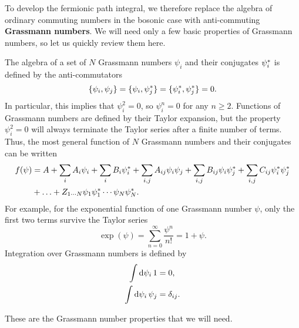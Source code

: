 To develop the fermionic path integral, we therefore replace the algebra of ordinary commuting numbers in the bosonic case with anti-commuting \textbf{Grassmann numbers}.
We will need only a few basic properties of Grassmann numbers, so let us quickly review them here.

The algebra of a set of $N$ Grassmann numbers $\psi_i$ and their conjugates ${\psi}^*_i$ is defined by the anti-commutators
\begin{equation}
	\{ \psi_i , \psi_j \} = 
	\{ \psi_i , {\psi}^*_j \} = 
	\{ {\psi}^*_i , {\psi}^*_j \} = 
	0 .
\label{eq:gnums:anticommutators}
\end{equation}
In particular, this implies that $\psi_i^2 = 0$, so $\psi_i^n = 0$ for any $n \geq 2$.
Functions of Grassmann numbers are defined by their Taylor expansion, but the property $\psi_i^2 = 0$ will always terminate the Taylor series after a finite number of terms.
Thus, the most general function of $N$ Grassmann numbers and their conjugates can be written
\begin{equation}
\begin{split}
	f(\psi) &= A + \sum_i A_i \psi_i + \sum_i B_i {\psi}^*_i + \sum_{i,j} A_{ij} \psi_i \psi_j + \sum_{i,j} B_{ij} \psi_i {\psi}^*_j + \sum_{i,j} C_{ij} {\psi}^*_i {\psi}^*_j \\
	        &+ \ldots + Z_{1 \cdots N} \psi_1 {\psi}^*_1 \cdots \psi_N {\psi}^*_N .
\end{split}
\label{eq:gnums:function_taylor_series}
\end{equation}
For example, for the exponential function of one Grassmann number $\psi$, only the first two terms survive the Taylor series
\begin{equation}
	\exp(\psi) = \sum_{n=0}^\infty \frac{\psi^n}{n!} = 1 + \psi .
\label{eq:gnums:exponential_taylor_series}
\end{equation}
Integration over Grassmann numbers is defined by
\begin{subequations}
\begin{align}
	\iffalse \pdv{1}{\psi_i}      &= 0,           & \qquad \fi \int \dif \psi_i \, 1      &= 0,            \label{eq:gnums:integration_const} \\
	\iffalse \pdv{\psi_j}{\psi_i} &= \delta_{ij}, & \qquad \fi \int \dif \psi_i \, \psi_j &= \delta_{ij} . \label{eq:gnums:integration_var}   
\end{align}
\end{subequations}
\iffalse
Note that $\int \dif \psi \, f(\psi) = \int \dif \psi \, [f(0) + f'(0) \psi] = f'(0) = \pdv{f(\psi)}/{\psi}$, so integration and differentiation are effectively identical operations.
\fi
These are the Grassmann number properties that we will need.

